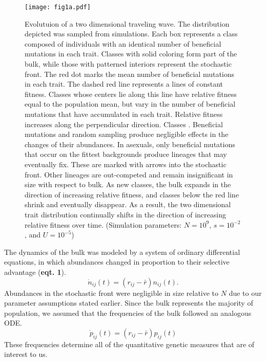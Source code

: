 \documentclass[11pt,twocolumn]{article}
\begin{document}
\begin{figure}
\texttt{[image: fig1a.pdf]}
\label{Figure 1.}
\caption{\footnotesize Evolutuion of a two dimensional traveling wave. The distribution depicted was sampled from simulations.  Each box represents a class composed of individuals with an identical number of beneficial mutations in each trait. Classes with solid coloring form part of the bulk, while those with patterned interiors represent the stochastic front. The red dot marks the mean number of beneficial mutations in each trait. The dashed red line represents a lines of constant fitness. Classes whose centers lie along this line have relative fitness equal to the population mean, but vary in the number of beneficial mutations that have accumulated in each trait. Relative fitness increases along the perpendicular direction. Classes . Beneficial mutations and random sampling produce negligible effects in the changes of their abundances. In asexuals, only beneficial mutations that occur on the fittest backgrounds produce lineages that may eventually fix. These are marked with arrows into the stochastic front. Other lineages are out-competed and remain insignificant in size with respect to bulk. As new classes, the bulk expands in the direction of increasing relative fitness, and classes below the red line shrink and eventually disappear. As a result, the two dimensional trait distribution continually shifts in the direction of increasing relative fitness over time. (Simulation parameters: $N=10^9$, $s=10^{-2}$, and $U=10^{-5}$)}
\end{figure}


The dynamics of the bulk was modeled by a system of ordinary differential equations, in which abundances changed in proportion to their selective advantage (\textbf{eqt. 1}). 
\begin{equation} \label{eq:1}
\dot{n}_{ij}(t) = (r_{ij}-\bar{r}) n_{ij}(t). 
\end{equation}
Abundances in the stochastic front were negligible in size relative to $N$ due to our parameter assumptions stated earlier.  Since the bulk represents the majority of population, we assumed that the frequencies of the bulk followed an analogous ODE.
\begin{equation} \label{eq:2}
\dot{p}_{ij}(t) = (r_{ij}-\bar{r}) p_{ij}(t) 
\end{equation}
These frequencies determine all of the quantitative genetic measures that are of interest to us.\par
\end{document}

